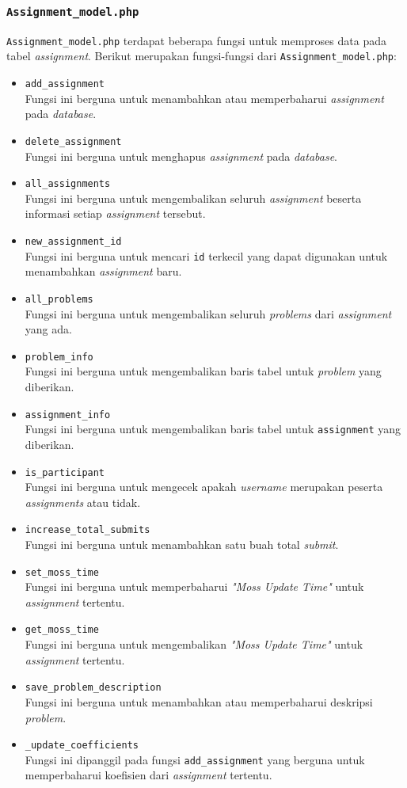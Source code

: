 \subsubsection{\texttt{Assignment\_model.php}}
\texttt{Assignment\_model.php} terdapat beberapa fungsi untuk memproses data pada tabel \textit{assignment}. Berikut merupakan fungsi-fungsi dari \texttt{Assignment\_model.php}:
\begin{itemize}
	\item \texttt{add\_assignment}\\
	Fungsi ini berguna untuk menambahkan atau memperbaharui \textit{assignment} pada \textit{database}.
	\item \texttt{delete\_assignment}\\
	Fungsi ini berguna untuk menghapus \textit{assignment} pada \textit{database}.
	\item \texttt{all\_assignments}\\
	Fungsi ini berguna untuk mengembalikan seluruh \textit{assignment} beserta informasi setiap \textit{assignment} tersebut.
	\item \texttt{new\_assignment\_id}\\
	Fungsi ini berguna untuk mencari \texttt{id} terkecil yang dapat digunakan untuk menambahkan \textit{assignment} baru.
	\item \texttt{all\_problems}\\
	Fungsi ini berguna untuk mengembalikan seluruh \textit{problems} dari \textit{assignment} yang ada.
	\item \texttt{problem\_info}\\
	Fungsi ini berguna untuk mengembalikan baris tabel untuk \textit{problem} yang diberikan.
	\item \texttt{assignment\_info}\\
	Fungsi ini berguna untuk mengembalikan baris tabel untuk \texttt{assignment} yang diberikan.
	\item \texttt{is\_participant}\\
	Fungsi ini berguna untuk mengecek apakah \textit{username} merupakan peserta \textit{assignments} atau tidak.
	\item \texttt{increase\_total\_submits}\\
	Fungsi ini berguna untuk menambahkan satu buah total \textit{submit}.
	\item \texttt{set\_moss\_time}\\
	Fungsi ini berguna untuk memperbaharui \textit{"Moss Update Time"} untuk \textit{assignment} tertentu.
	\item \texttt{get\_moss\_time}\\
	Fungsi ini berguna untuk mengembalikan \textit{"Moss Update Time"} untuk \textit{assignment} tertentu.
	\item \texttt{save\_problem\_description}\\
	Fungsi ini berguna untuk menambahkan atau memperbaharui deskripsi \textit{problem}.
	\item \texttt{\_update\_coefficients}\\
	Fungsi ini dipanggil pada fungsi \texttt{add\_assignment} yang berguna untuk memperbaharui koefisien dari \textit{assignment} tertentu.
\end{itemize}
